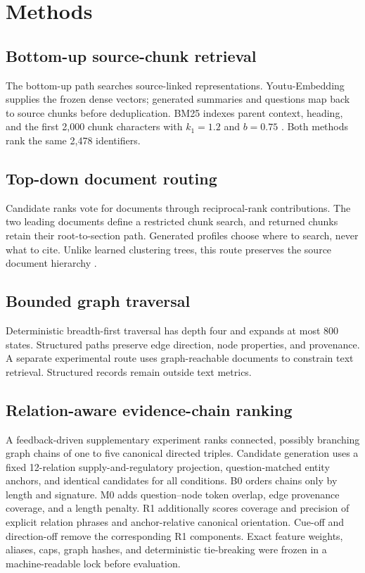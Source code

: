 \section{Methods}
\label{sec:methods}

\subsection{Bottom-up source-chunk retrieval}

The bottom-up path searches source-linked representations. Youtu-Embedding supplies the frozen dense vectors; generated summaries and questions map back to source chunks before deduplication. BM25 indexes parent context, heading, and the first 2,000 chunk characters with $k_1=1.2$ and $b=0.75$ \cite{robertson2009bm25}. Both methods rank the same 2,478 identifiers.

\subsection{Top-down document routing}

Candidate ranks vote for documents through reciprocal-rank contributions. The two leading documents define a restricted chunk search, and returned chunks retain their root-to-section path. Generated profiles choose where to search, never what to cite. Unlike learned clustering trees, this route preserves the source document hierarchy \cite{sarthi2024raptor}.

\subsection{Bounded graph traversal}

Deterministic breadth-first traversal has depth four and expands at most 800 states. Structured paths preserve edge direction, node properties, and provenance. A separate experimental route uses graph-reachable documents to constrain text retrieval. Structured records remain outside text metrics.

\subsection{Relation-aware evidence-chain ranking}

A feedback-driven supplementary experiment ranks connected, possibly branching graph chains of one to five canonical directed triples. Candidate generation uses a fixed 12-relation supply-and-regulatory projection, question-matched entity anchors, and identical candidates for all conditions. B0 orders chains only by length and signature. M0 adds question--node token overlap, edge provenance coverage, and a length penalty. R1 additionally scores coverage and precision of explicit relation phrases and anchor-relative canonical orientation. Cue-off and direction-off remove the corresponding R1 components. Exact feature weights, aliases, caps, graph hashes, and deterministic tie-breaking were frozen in a machine-readable lock before evaluation.

